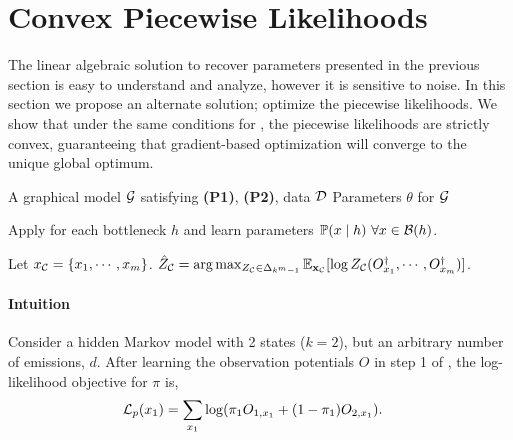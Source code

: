 \section{Convex Piecewise Likelihoods}
\label{sec:piecewise}

The linear algebraic solution to recover parameters presented in the
  previous section is easy to understand and analyze, however it is
  sensitive to noise. 
In this section we propose an alternate solution; optimize the piecewise
  likelihoods.
We show that under the same conditions for , the
  piecewise likelihoods are strictly convex, guaranteeing that
  gradient-based optimization will converge to the unique global
  optimum.

\begin{algorithm}
  \caption{\LearnPiecewise}
  \label{algo:piecewise}
  \begin{algorithmic}
    \REQUIRE A graphical model $\mathcal{G}$ satisfying \textbf{(P1)}, \textbf{(P2)}, data $\mathcal{D}$
    \ENSURE Parameters $\theta$ for $\mathcal{G}$

        \STATE Apply \TensorFactorize for each bottleneck $h$ and learn parameters $\mathbb{P}(x \mid h) ~ \forall x \in \mathcal{B}(h)$.

      \ENDFOR
      \STATE Let $x_{\mathcal{C}} = \{x_1, \cdots, x_m\}$.
      \STATE $\hat {Z}_{\mathcal{C}} = \arg\max_{Z_{\mathcal{C}} \in \Delta_{k^m-1}} \mathbb{E}_{\mathbf{x}_{\mathcal{C}}}[ \log Z_{\mathcal{C}}( {O}^{\dagger}_{x_1}, \cdots, {O}^{\dagger}_{x_m} ) ]$.
      \ENDFOR
  \end{algorithmic}
\end{algorithm}


\paragraph{Intuition}

Consider a hidden Markov model  with
  2 states ($k=2$), but an arbitrary number of emissions, $d$. 
After learning the observation potentials $O$ in step 1 of
  , the log-likelihood objective for $\pi$ is,
\begin{align}
  \mathcal{L}_p(x_1) &= \sum_{x_1} \log( \pi_1 O_{1,x_1} + (1-\pi_1) O_{2,x_1} ).
\end{align}

